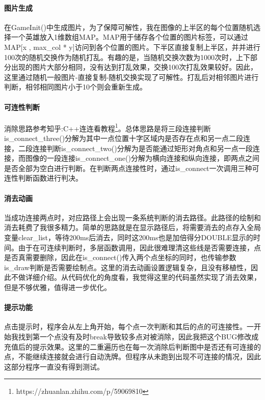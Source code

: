 \paragraph{图片生成}
在GameInit()中生成图片，为了保障可解性，我在图像的上半区的每个位置随机选择一个英雄放入1维数组MAP。MAP用于储存各个位置的图片标签，可以通过MAP[x , max\_col * y]访问到各个位置的图片。下半区直接复制上半区，并并进行100次的随机交换作为随机打乱。有趣的是，当随机交换次数为1000次时，上下部分出现的图片大部分相同，没有达到打乱效果，交换100次打乱效果较好。因此，这里通过随机一般图片-直接复制-随机交换实现了可解性。打乱后对相邻图片进行判断，相邻相同图片小于10个则会重新生成。

\paragraph{可连性判断}
消除思路参考知乎:C++连连看教程\footnote{https://zhuanlan.zhihu.com/p/59069810}。总体思路是将三段连接判断is\_connect\_three()分解为其中一点位置十字区域内是否存在点和另一点二段连接，二段连接判断is\_connect\_two()分解为是否能通过矩形对角点和另一点一段连接，而图像的一段连接is\_connect\_one()分解为横向连接和纵向连接，即两点之间是否全部为空白进行判断。在判断两点连接性时，通过is\_connect一次调用三种可连性判断函数进行判决。

\paragraph{消去动画}
当成功连接两点时，对应路径上会出现一条系统判断的消去路径。此路径的绘制和消去耗费了我很多精力。简单的思路就是在显示路径后，将需要消去的点存入全局变量clear\_list，等待200ms后消去，同时这200ms也是加倍得分DOUBLE显示的时间。由于在可连续判断时，多层函数调用，因此很难理清这些线是否需要连接，点是否真需要删除，因此在is\_connect()传入两个点坐标的同时，也传输参数is\_draw判断是否需要绘制点。这里的消去动画设置逻辑复杂，且没有移植性，因此不做详细介绍。从代码优化的角度看，我觉得这里的代码虽然实现了消去效果，但是不够优雅，值得进一步优化。

\paragraph{提示功能}
点击提示时，程序会从左上角开始，每个点一次判断和其后的点的可连接性。一开始我找到第一个点没有及时break导致较多点对被消除，因此我把这个BUG修改成充值后的提示效果。这里的二重遍历也在每一次消除后判断图中是否还有可连接的点，不能继续连接就会进行自动洗牌。但程序从未跑到出现不可连接的情况，因此这部分程序一直没有得到测试。

